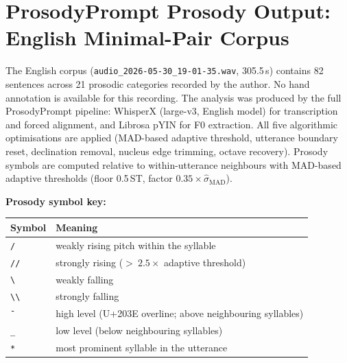 
\appendix

\chapter{ProsodyPrompt Prosody Output: English Minimal-Pair Corpus}
\label{app:english}

The English corpus (\texttt{audio\_2026-05-30\_19-01-35.wav}, 305.5\,s) contains
82 sentences across 21 prosodic categories recorded by the author.
No hand annotation is available for this recording.
The analysis was produced by the full ProsodyPrompt pipeline: WhisperX (large-v3,
English model) for transcription and forced alignment, and Librosa pYIN for F0
extraction. All five algorithmic optimisations are applied (MAD-based adaptive
threshold, utterance boundary reset, declination removal, nucleus edge trimming,
octave recovery). Prosody symbols are computed relative to within-utterance
neighbours with MAD-based adaptive thresholds (floor 0.5\,ST,
factor $0.35 \times \hat{\sigma}_\mathrm{MAD}$).

\medskip\noindent\textbf{Prosody symbol key:}

\begin{center}
\small
\begin{tabular}{ll}
\toprule
Symbol & Meaning \\
\midrule
\texttt{/}   & weakly rising pitch within the syllable \\
\texttt{//}  & strongly rising (${>}\ 2.5\times$ adaptive threshold) \\
\texttt{\textbackslash}  & weakly falling \\
\texttt{\textbackslash\textbackslash} & strongly falling \\
\texttt{{\={}}}  & high level (U+203E overline; above neighbouring syllables) \\
\texttt{\_}  & low level (below neighbouring syllables) \\
\texttt{*}   & most prominent syllable in the utterance \\
\bottomrule
\end{tabular}
\end{center}

